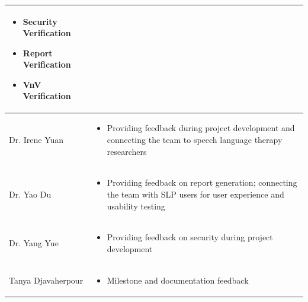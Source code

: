 \documentclass[12pt, titlepage]{article}
\renewcommand{\_}{\oldunderscore\allowbreak}
\begin{document}
{\begin{longtable}{ | p{4.5cm} | p{8.2cm} | }
\begin{itemize}[leftmargin=*, nosep, before=\vspace{1mm}, after=\vspace{1mm}]
    \item Security Verification
    \item Report Verification
    \item VnV Verification
  \end{itemize} \\
  \hline
  Dr. Irene Yuan &
  \begin{itemize}[leftmargin=*, nosep, before=\vspace{1mm}, after=\vspace{1mm}]
    \item Providing feedback during project development and connecting the team to speech language therapy researchers
  \end{itemize} \\
  \hline
  Dr. Yao Du &
  \begin{itemize}[leftmargin=*, nosep, before=\vspace{1mm}, after=\vspace{1mm}]
    \item Providing feedback on report generation; connecting the team with SLP users for user experience and usability testing
  \end{itemize} \\
  \hline
  Dr. Yang Yue &
  \begin{itemize}[leftmargin=*, nosep, before=\vspace{1mm}, after=\vspace{1mm}]
    \item Providing feedback on security during project development
  \end{itemize} \\
  \hline
  Tanya Djavaherpour &
  \begin{itemize}[leftmargin=*, nosep, before=\vspace{1mm}, after=\vspace{1mm}]
    \item Milestone and documentation feedback
  \end{itemize} \\
  \hline
\end{longtable}}

\vspace{1em}
\end{document}
